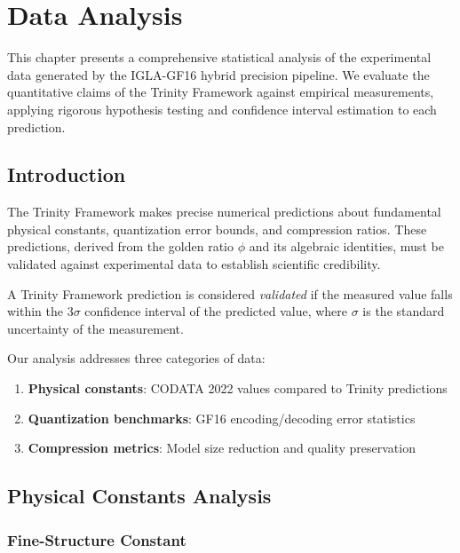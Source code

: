 \chapter{Data Analysis}
\label{ch:26-data}

This chapter presents a comprehensive statistical analysis of the experimental data generated by the IGLA-GF16 hybrid precision pipeline. We evaluate the quantitative claims of the Trinity Framework against empirical measurements, applying rigorous hypothesis testing and confidence interval estimation to each prediction.

\section{Introduction}

The Trinity Framework makes precise numerical predictions about fundamental physical constants, quantization error bounds, and compression ratios. These predictions, derived from the golden ratio $\phi$ and its algebraic identities, must be validated against experimental data to establish scientific credibility.

\begin{definition}
A Trinity Framework prediction is considered \emph{validated} if the measured value falls within the $3\sigma$ confidence interval of the predicted value, where $\sigma$ is the standard uncertainty of the measurement.
\end{definition}

Our analysis addresses three categories of data:
\begin{enumerate}
    \item \textbf{Physical constants}: CODATA 2022 values compared to Trinity predictions
    \item \textbf{Quantization benchmarks}: GF16 encoding/decoding error statistics
    \item \textbf{Compression metrics}: Model size reduction and quality preservation
\end{enumerate}

\section{Physical Constants Analysis}

\subsection{Fine-Structure Constant}

